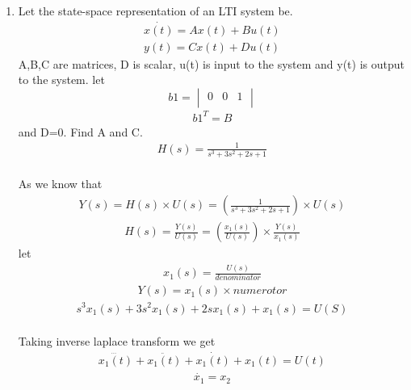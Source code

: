 \begin{enumerate}[label=\thesection.\arabic*.,ref=\thesection.\theenumi]
\item Let the state-space representation of an LTI system be.
\begin{align*}
 \dot{x(t)}=Ax(t)+Bu(t) \\
 y(t)=Cx(t)+Du(t)
\end{align*}
A,B,C are matrices, D is scalar, u(t) is input to the system and y(t) is output to the system. let
\begin{equation}
 b1 =\begin{vmatrix}
  0&0&1\\
 \end{vmatrix}
\end{equation}
\begin{align}
b1^T=B
\end{align}
and D=0. Find A and C.
\begin{align}
H(s)=\frac{1}{s^3+3s^2+2s+1}
\end{align}
\solution
\bigskip
\\ As we know that
\bigskip
\bigskip
\bigskip
\bigskip
\begin{align}
Y(s)=H(s) \times U(s)= (\frac{1}{s^3+3s^2+2s+1}) \times U(s)
\end{align}
\begin{align}
H(s)=\frac{Y(s)}{U(s)}=(\frac{x_{1}(s)}{U(s)})\times \frac{Y(s)}{x_{1}(s)}
\end{align}
let
\begin{align}
x_{1}(s)=\frac{U(s)}{denominator}
\end{align}
\bigskip
\begin{align}
Y(s)=x_{1}(s)\times numerotor
\end{align}
\bigskip
\begin{align}
s^3x_{1}(s)+3s^2x_{1}(s)+2sx_{1}(s)+x_{1}(s)=U(S)
\end{align}
\\ Taking inverse laplace transform we get
\bigskip
\bigskip
\begin{align}
\dddot{x_{1}(t)}+\ddot{x_{1}(t)}+\dot{x_{1}(t)}+x_{1}(t)=U(t)
\end{align}
\begin{align}
\dot{x_{1}}=x_{2}
\end{align}
\begin{align}

\end{align}
\end{enumerate}
